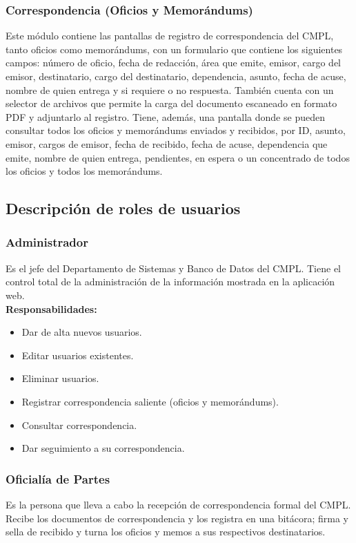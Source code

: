 \subsubsection{Correspondencia (Oficios y Memorándums)}

Este módulo contiene las pantallas de registro de correspondencia del CMPL, tanto oficios como memorándums, con un formulario que contiene los siguientes campos: número de oficio, fecha de redacción, área que emite, emisor, cargo del emisor, destinatario, cargo del destinatario, dependencia, asunto, fecha de acuse, nombre de quien entrega y si requiere o no respuesta. También cuenta con un selector de archivos que permite la carga del documento escaneado en formato PDF y adjuntarlo al registro. Tiene, además, una pantalla donde se pueden consultar todos los oficios y memorándums enviados y recibidos, por ID, asunto, emisor, cargos de emisor, fecha de recibido, fecha de acuse, dependencia que emite, nombre de quien entrega, pendientes, en espera o un concentrado de todos los oficios y todos los memorándums.\\

\subsection{Descripción de roles de usuarios}

\subsubsection{Administrador}
Es el jefe del Departamento de Sistemas y Banco de Datos del CMPL. Tiene el control total de la administración de la información mostrada en la aplicación web.\\

\textbf{Responsabilidades:}
\begin{itemize}
	\item Dar de alta nuevos usuarios.
	\item Editar usuarios existentes.
	\item Eliminar usuarios.
	\item Registrar correspondencia saliente (oficios y memorándums).
	\item Consultar correspondencia.
	\item Dar seguimiento a su correspondencia.
\end{itemize}

\subsubsection{Oficialía de Partes}
Es la persona que lleva a cabo la recepción de correspondencia formal del CMPL. Recibe los documentos de correspondencia y los registra en una bitácora; firma y sella de recibido y turna los oficios y memos a sus respectivos destinatarios.\\

